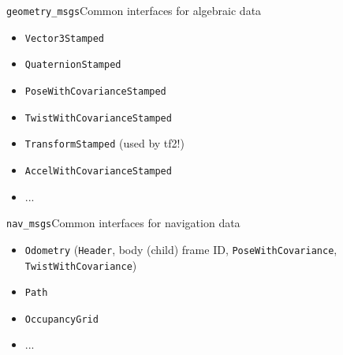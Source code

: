 \begin{frame}{\texttt{geometry\_msgs}}{Common interfaces for algebraic data}
  \begin{itemize}
    \item \texttt{Vector3Stamped}
    \item \texttt{QuaternionStamped}
    \item \texttt{PoseWithCovarianceStamped}
    \item \texttt{TwistWithCovarianceStamped}
    \item \texttt{TransformStamped} (used by tf2!)
    \item \texttt{AccelWithCovarianceStamped}
    \item ...
  \end{itemize}
\end{frame}

\begin{frame}{\texttt{nav\_msgs}}{Common interfaces for navigation data}
  \begin{itemize}
    \item \texttt{Odometry} (\texttt{Header}, body (child) frame ID, \texttt{PoseWithCovariance}, \texttt{TwistWithCovariance})
    \item \texttt{Path}
    \item \texttt{OccupancyGrid}
    \item ...
  \end{itemize}
\end{frame}
